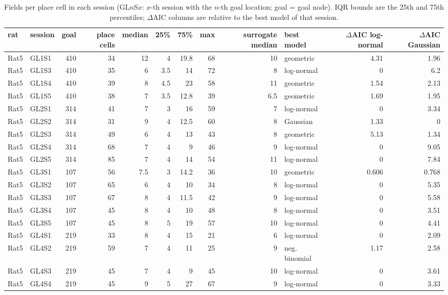 \begin{table}[htbp]
\centering
\scriptsize
\caption{Fields per place cell in each session (GL$n$S$x$: $x$-th session with the $n$-th goal location; goal = goal node). IQR bounds are the 25th and 75th percentiles; $\Delta$AIC columns are relative to the best model of that session.}
\label{tab:field_count:sessions}
\begin{tabular}{llrrrrrrrlrr}
\toprule
rat & session & goal & place cells & median & 25\% & 75\% & max & surrogate median & best model & $\Delta$AIC log-normal & $\Delta$AIC Gaussian \\
\midrule
Rat5 & GL1S1 & 410 & 34 & 12 & 4 & 19.8 & 68 & 10 & geometric & 4.31 & 1.96 \\
Rat5 & GL1S3 & 410 & 35 & 6 & 3.5 & 14 & 72 & 8 & log-normal & 0 & 6.2 \\
Rat5 & GL1S4 & 410 & 39 & 8 & 4.5 & 23 & 58 & 11 & geometric & 1.54 & 2.13 \\
Rat5 & GL1S5 & 410 & 38 & 7 & 3.5 & 12.8 & 39 & 6.5 & geometric & 1.69 & 1.95 \\
Rat5 & GL2S1 & 314 & 41 & 7 & 3 & 16 & 59 & 7 & log-normal & 0 & 3.34 \\
Rat5 & GL2S2 & 314 & 31 & 9 & 4 & 12.5 & 60 & 8 & Gaussian & 1.33 & 0 \\
Rat5 & GL2S3 & 314 & 49 & 6 & 4 & 13 & 43 & 8 & geometric & 5.13 & 1.34 \\
Rat5 & GL2S4 & 314 & 68 & 7 & 4 & 9 & 46 & 9 & log-normal & 0 & 9.05 \\
Rat5 & GL2S5 & 314 & 85 & 7 & 4 & 14 & 54 & 11 & log-normal & 0 & 7.84 \\
Rat5 & GL3S1 & 107 & 56 & 7.5 & 3 & 14.2 & 36 & 10 & geometric & 0.606 & 0.768 \\
Rat5 & GL3S2 & 107 & 65 & 6 & 4 & 10 & 34 & 8 & log-normal & 0 & 5.35 \\
Rat5 & GL3S3 & 107 & 67 & 8 & 4 & 11.5 & 42 & 9 & log-normal & 0 & 5.58 \\
Rat5 & GL3S4 & 107 & 45 & 8 & 4 & 10 & 48 & 8 & log-normal & 0 & 3.51 \\
Rat5 & GL3S5 & 107 & 45 & 8 & 5 & 19 & 57 & 10 & log-normal & 0 & 4.41 \\
Rat5 & GL4S1 & 219 & 33 & 8 & 4 & 15 & 21 & 6 & log-normal & 0 & 2.09 \\
Rat5 & GL4S2 & 219 & 59 & 7 & 4 & 11 & 25 & 9 & neg. binomial & 1.17 & 2.58 \\
Rat5 & GL4S3 & 219 & 45 & 7 & 4 & 9 & 45 & 10 & log-normal & 0 & 3.61 \\
Rat5 & GL4S4 & 219 & 45 & 9 & 5 & 27 & 67 & 9 & log-normal & 0 & 3.33 \\

\end{tabular}
\end{table}
